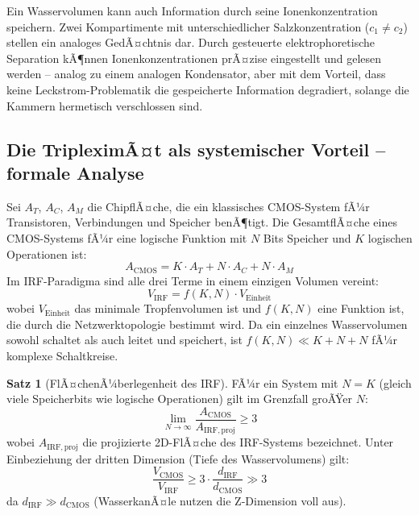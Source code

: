 ﻿\documentclass[a4paper,12pt]{scrreprt}
\theoremstyle{definition}
\newtheorem{satz}{Satz}[section]
\begin{document}
Ein Wasservolumen kann auch Information durch seine Ionenkonzentration
speichern. Zwei Kompartimente mit unterschiedlicher Salzkonzentration
($c_1 \neq c_2$) stellen ein analoges GedÃ¤chtnis dar. Durch gesteuerte
elektrophoretische Separation kÃ¶nnen Ionenkonzentrationen prÃ¤zise eingestellt
und gelesen werden -- analog zu einem analogen Kondensator, aber mit dem
Vorteil, dass keine Leckstrom-Problematik die gespeicherte Information
degradiert, solange die Kammern hermetisch verschlossen sind.

\subsection{Die TripleximÃ¤t als systemischer Vorteil -- formale Analyse}

Sei $A_T$, $A_C$, $A_M$ die ChipflÃ¤che, die ein klassisches CMOS-System
fÃ¼r Transistoren, Verbindungen und Speicher benÃ¶tigt. Die GesamtflÃ¤che
eines CMOS-Systems fÃ¼r eine logische Funktion mit $N$ Bits Speicher und
$K$ logischen Operationen ist:
\begin{equation}
	A_{\mathrm{CMOS}} = K \cdot A_T + N \cdot A_C + N \cdot A_M
	\label{eq:cmos_flaeche}
\end{equation}
Im IRF-Paradigma sind alle drei Terme in einem einzigen Volumen vereint:
\begin{equation}
	V_{\mathrm{IRF}} = f(K, N) \cdot V_{\mathrm{Einheit}}
	\label{eq:irf_volumen}
\end{equation}
wobei $V_{\mathrm{Einheit}}$ das minimale Tropfenvolumen ist und $f(K,N)$
eine Funktion ist, die durch die Netzwerktopologie bestimmt wird.
Da ein einzelnes Wasservolumen sowohl schaltet als auch leitet und
speichert, ist $f(K,N) \ll K + N + N$ fÃ¼r komplexe Schaltkreise.

\begin{satz}[FlÃ¤chenÃ¼berlegenheit des IRF]
	FÃ¼r ein System mit $N = K$ (gleich viele Speicherbits wie logische Operationen)
	gilt im Grenzfall groÃŸer $N$:
	\begin{equation}
		\lim_{N\to\infty} \frac{A_{\mathrm{CMOS}}}{A_{\mathrm{IRF,proj}}} \geq 3
		\label{eq:ueberlegenheit}
	\end{equation}
	wobei $A_{\mathrm{IRF,proj}}$ die projizierte 2D-FlÃ¤che des IRF-Systems bezeichnet.
	Unter Einbeziehung der dritten Dimension (Tiefe des Wasservolumens) gilt:
	\begin{equation}
		\frac{V_{\mathrm{CMOS}}}{V_{\mathrm{IRF}}} \geq 3 \cdot \frac{d_{\mathrm{IRF}}}{d_{\mathrm{CMOS}}}
		\gg 3
		\label{eq:volumenueberlegenheit}
	\end{equation}
	da $d_{\mathrm{IRF}} \gg d_{\mathrm{CMOS}}$ (WasserkanÃ¤le nutzen die Z-Dimension voll aus).
\end{satz}
\end{document}
